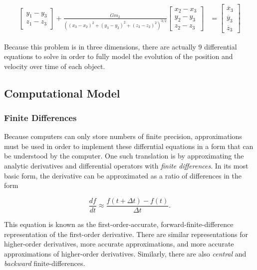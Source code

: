 \documentclass{report}
\begin{document}
\begin{align}
\begin{bmatrix}
                    y_1 - y_3 \\
                    z_1 - z_3
                \end{bmatrix} + 
                \frac{G m_2}{((x_3 - x_2)^2 + (y_3 - y_2)^2 + (z_3 - z_2)^2)^{3/2}} 
                \begin{bmatrix}
                    x_2 - x_3 \\
                    y_2 - y_3 \\
                    z_2 - z_3
                \end{bmatrix} &= \begin{bmatrix}
                    \ddot{x_3} \\
                    \ddot{y_3} \\ 
                    \ddot{z_3}
                \end{bmatrix}
            \end{align}

            Because this problem is in three dimensions, there are actually 9 differential equations to solve in order to fully model the evolution of the position and velocity over time of each object.
\pagebreak
        \subsection{Computational Model}
        
            \subsubsection{Finite Differences}

                Because computers can only store numbers of finite precision, approximations must be used in order to implement these differntial equations in a form that can be understood by the computer.  One such translation is by approximating the analytic derivatives and differential operators with \emph{finite differences}. In its most basic form, the derivative can be approximated as a ratio of differences in the form

                \begin{equation}
                    \frac{df}{dt} \approx \frac{f(t + \Delta t) - f(t)}{\Delta t}.
                \end{equation}

                This equation is known as the first-order-accurate, forward-finite-difference representation of the first-order derivative.  There are similar representations for higher-order derivatives, more accurate approximations, and more accurate approximations of higher-order derivatives. Similarly, there are also \emph{central} and \emph{backward} finite-differences.
\end{document}
